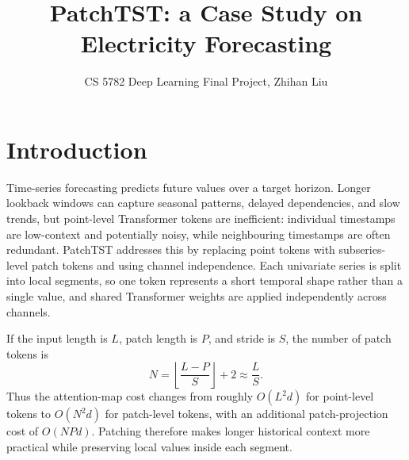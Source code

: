\documentclass[11pt,twocolumn]{article}
\title{\vspace{-1.8em}\textbf{PatchTST: a Case Study on Electricity Forecasting}}
\author{CS 5782 Deep Learning Final Project, Zhihan Liu }
\date{}
\begin{document}
\twocolumn[
\maketitle
\begin{center}
\end{center}
]

\section{Introduction}

Time-series forecasting predicts future values over a target horizon. Longer lookback windows can capture seasonal patterns, delayed dependencies, and slow trends, but point-level Transformer tokens are inefficient: individual timestamps are low-context and potentially noisy, while neighbouring timestamps are often redundant. PatchTST \cite{nie2023patchtst} addresses this by replacing point tokens with subseries-level patch tokens and using channel independence. Each univariate series is split into local segments, so one token represents a short temporal shape rather than a single value, and shared Transformer weights are applied independently across channels.

If the input length is $L$, patch length is $P$, and stride is $S$, the number of patch tokens is
\begin{equation}
N = \left\lfloor \frac{L-P}{S} \right\rfloor + 2 \approx \frac{L}{S}.
\label{eq:patch_count}
\end{equation}
Thus the attention-map cost changes from roughly $O(L^2d)$ for point-level tokens to $O(N^2d)$ for patch-level tokens, with an additional patch-projection cost of $O(NPd)$. Patching therefore makes longer historical context more practical while preserving local values inside each segment.
\end{document}
